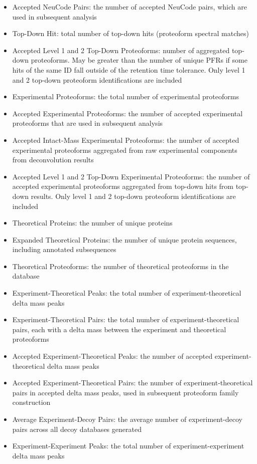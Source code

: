 \begin{itemize}
\begin{itemize}
\item Accepted NeuCode Pairs: the number of accepted NeuCode pairs, which are used in subsequent analysis
\item Top-Down Hit: total number of top-down hits (proteoform spectral matches)
\item Accepted Level 1 and 2 Top-Down Proteoforms: number of aggregated top-down proteoforms. May be greater than the number of unique PFRs if some hits of the same ID fall outside of the retention time tolerance. Only level 1 and 2 top-down proteoform identifications are included
\item Experimental Proteoforms: the total number of experimental proteoforms
\item Accepted Experimental Proteoforms: the number of accepted experimental proteoforms that are used in subsequent analysis
\item Accepted Intact-Mass Experimental Proteoforms: the number of accepted experimental proteoforms aggregated from raw experimental components from deconvolution results
\item Accepted Level 1 and 2 Top-Down Experimental Proteoforms: the number of accepted experimental proteoforms aggregated from top-down hits from top-down results. Only level 1 and 2 top-down proteoform identifications are included
\item Theoretical Proteins: the number of unique proteins
\item Expanded Theoretical Proteins: the number of unique protein sequences, including annotated subsequences
\item Theoretical Proteoforms: the number of theoretical proteoforms in the database
\item Experiment-Theoretical Peaks: the total number of experiment-theoretical delta mass peaks
\item Experiment-Theoretical Pairs: the total number of experiment-theoretical pairs, each with a delta mass between the experiment and theoretical proteoforms
\item Accepted Experiment-Theoretical Peaks: the number of accepted experiment-theoretical delta mass peaks
\item Accepted Experiment-Theoretical Pairs: the number of experiment-theoretical pairs in accepted delta mass peaks, used in subsequent proteoform family construction
\item Average Experiment-Decoy Pairs: the average number of experiment-decoy pairs across all decoy databases generated
\item Experiment-Experiment Peaks: the total number of experiment-experiment delta mass peaks

\end{itemize}
\end{itemize}
